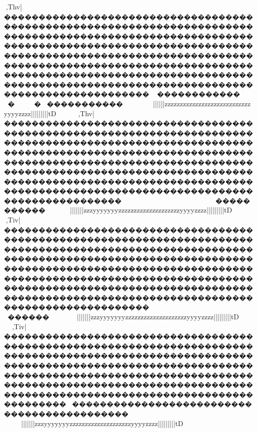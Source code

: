 {{{{{{{{{{{{{{{{{{{{{{{{{{{{{{{{{{{{{{{{{{{{{{{{{{{{{{{{{{{{{{{{{{{{{{{{{{{{{{{{{{{{{{{{{{{{{{{{{{{{{{{{{{{{{{{{{{{{{{{{{{{{{{{{{{{{{{{{{{{{{{{{{{{{{{{{{{{{{{{{{{{{{{{{{{{{{{{{{{{{{{{{{{{{{{{{{{{{{{{{{{{{{{{{{{{{{{{{{{{{{{{{{{{{{{{{{{{{{{{{{{{{{{{{{{{{{{{{{{{{{{{{{{{{{{{{{{{{{{{{{{{{{{{{{{{{{{{{{{{{{{{{{{{{{{{{{{{{{{{{{{{{{{{{{{{{{{{{{{{{{{{{{{{{{{{{{{{{{{{{{{{{{{{{{{{{{{{{{{{{{{{{{{{{{{{{{{{{{{{{{{{{{{{{{{{{{{{{{{{{{{{{{{{{{{{{{{{{{{{{{{{{{{{{{{{{{{{{{{{{{{{{{{{{{{{{{{{{{{{{{{{{{{{{{{{{{{{{{{{{{{{{{{{{{{{{{{{{{{{{{{{{{{{{{{{{{{{{{{{{{{{{{{{{{{{{{{{{{{{{{{{{{{{{{{{{{{{{{{{{{{{{{{{{{{{{{{{{{{{{{{{{{{{{{{{{{{{{{{{{{{{{{{{{{{{{{{{{{{{{{{{{{{{{{{{{{{{{{{{{{{{{{{{{{{{{{{{{{{{{{{,Thv|����������������������������������������������������������������������������������������������������������������������������������������������������������������������������������������������������������������������������������������������������������������������������������������������������������������������������������������������~~~~~~~}}}}}}}}}||}||||{{{{{{{{{{{{zzzzzzzzzzzzzzzzzzzzzzzzzzzzyyyyzzzz{{{{{{{{{{{|||||||||}}}}}}}}}tD

,Thv|�����������������������������������������������������������������������������������������������������������������������������������������������������������������������������������������������������������������������������������������������������������������������������������������������������������������~~~~~~~�����������~~~~~~}}|}}}}}}}}||}||||{{{{{{{{{{zzzyyyyyyyzzzzzzzzzzzzzzzzzzzzyyyyzzzz{{{{{{{{{{{|||||||||}}}}}}}}}tD

,Tiv|���������������������������������������������������������������������������������������������������������������������������������������������������������������������������������������������������������������������������������������������������������������������������������������������������������������������~~~~~~~~~~~~~~������~~~~~~~~}}|}}}}}}}}||}||||{{{{{{{{{{zzzyyyyyyyzzzzzzzzzzzzzzzzzzzzyyyyzzzz{{{{{{{{{{{|||||||||}}}}}}}}}tD
,Tiv|�����������������������������������������������������������������������������������������������������������������������������������������������������������������������������������������������������������������������������������������������������������������������������������������������������������������~~~~~~~~~~~~~~~~~~~~~}}}}}~~~}}|}}}}}}}}||}||||{{{{{{{{{{zzzyyyyyyyzzzzzzzzzzzzzzzzzzzzyyyyzzzz{{{{{{{{{{{|||||||||}}}}}}}}}tD
}}}}}}}}}}}}}}}}}}}}}}}}}}}}}}}}}}}}}}}}}}}}}}}}}}}}}}}}}}}}}}}}}}}}}}}}}}}}}}}}}}}}}}}}}}}}}}}}}}}}}}}}}}}}}}}}}}}}}}}}}}}}}}}}}}}}}}}}}}}}}}}}}}}}}}}}}}}}}}}}}}}}}}}}}}}}}}}}}}}}}}}}}}}}}}}}}}}}}}}}}}}}}}}}}}}}}}}}}}}}}}}}}}}}}}}}}}}}}}}}}}}}}}}}}}}}}}}}}}}}}}}}}}}}}}}}}}}}}}}}}}}}}}}}}}}}}}}}}}}}}}}}}}}}}}}}}}}}}}}}}}}}}}}}}}}}}}}}}}}}}}}}}}}}}}}}}}}}}}}}}}}}}}}}}}}}}}}}}}}}}}}}}}}}}}}}}}}}}}}}}}}}}}}}}}}}}}}}}}}}}}}}}}}}}}}}}}}}}}}}}}}}}}}}}}}}}}}}}}}}}}}}}}}}}}}}}}}}}}}}}}}}}}}}}}}}}}}}}}}}}}}}}}}}}}}}}}}}}}}}}}}}}}}}}}}}}}}}}}}}}}}}}}}}}}}}}}}}}}}}}}}}}}}}}}}}}}}}}}}}}}}}}}}}}}}}}}}}}}}}}}}}}}}}}}}}}}}}}}}}}}}}}}}}}}}}}}}}}}}}}}}}}}}}}}}}}}}}}}}}}}}}}}}}}}}}}}}}}}}}}}}}
